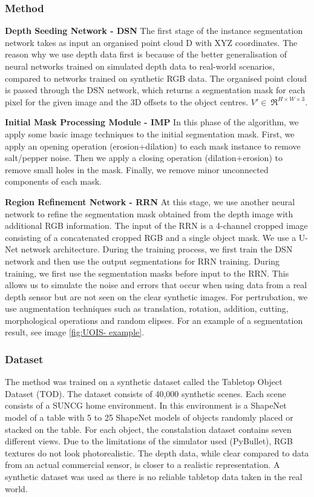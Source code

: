 \documentclass[10pt,twocolumn,letterpaper]{article}
\begin{document}
\subsubsection{Method}

\textbf{Depth Seeding Network - DSN}
The first stage of the instance segmentation network takes as input an organised point cloud D with XYZ coordinates. The reason why we use depth data first is because of the better generalisation of neural networks trained on simulated depth data to real-world scenarios, compared to networks trained on synthetic RGB data. The organised point cloud is passed through the DSN network, which returns a segmentation mask for each pixel for the given image and the 3D offsets to the object centres. \(V'\in\ \Re^{H \times W \times 3}\).

\textbf{Initial Mask Processing Module - IMP }
In this phase of the algorithm, we apply some basic image techniques to the initial segmentation mask. First, we apply an opening operation (erosion+dilation) to each mask instance to remove salt/pepper noise. Then we apply a closing operation (dilation+erosion) to remove small holes in the mask. Finally, we remove minor unconnected components of each mask. 

\textbf{Region Refinement Network - RRN}
At this stage, we use another neural network to refine the segmentation mask obtained from the depth image with additional RGB information. The input of the RRN is a 4-channel cropped image consisting of a concatenated cropped RGB and a single object mask. We use a U-Net network architecture.
During the training process, we first train the DSN network and then use the output segmentations for RRN training. During training, we first use the segmentation masks before input to the RRN. This allows us to simulate the noise and errors that occur when using data from a real depth sensor but are not seen on the clear synthetic images. For pertrubation, we use augmentation techniques such as translation, rotation, addition, cutting, morphological operations and random elipses. For an example of a segmentation result, see image \ref{fig:UOIS- example}. 

\subsubsection{Dataset}
The method was trained on a synthetic dataset called the Tabletop Object Dataset (TOD). The dataset consists of 40,000 synthetic scenes. Each scene consists of a SUNCG home environment. In this environment is a ShapeNet model of a table with 5 to 25 ShapeNet \cite{Chang_Funkhouser_Guibas_Hanrahan_Huang_Li_Savarese_Savva_Song_Su_et} models of objects randomly placed or stacked on the table. For each object, the constalation dataset contains seven different views. Due to the limitations of the simulator used (PyBullet), RGB textures do not look photorealistic. The depth data, while clear compared to data from an actual commercial sensor, is closer to a realistic representation. A synthetic dataset was used as there is no reliable tabletop data taken in the real world.
\end{document}
